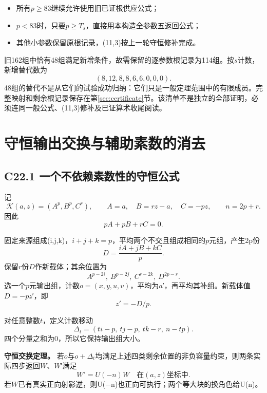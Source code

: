 \begin{itemize}
\tightlist
\item
  {所有\ensuremath{p}\ensuremath{\ge}83继续允许使用旧已证根供应公式；}
\item
  {\ensuremath{p<83}时，只要\ensuremath{p}\ensuremath{\ge}\ensuremath{T_{s}}，直接用本构造全参数五返回公式；}
\item
  {其他小参数保留原根记录，(11,3)按上一轮守恒修补完成。}
\end{itemize}

{旧162组中恰有48组满足新增条件，故需保留的逐参数根记录为114组。按\ensuremath{s}计数，新增替代数为} \[
(8,12,8,8,6,6,0,0,0).
\] {48组的替代不是从它们的试验成功归纳：它们只是一般定理范围中的有限成员。完整映射和剩余根记录保存在}第\ref{sec:certificate}节{。该清单不是独立的全部证明，必须连同一般公式、(11,3)修补及已证算术收尾阅读。}


\section{守恒输出交换与辅助素数的消去}\label{construct:conservation}
\subsection*{\texorpdfstring{{C22.1} {一个不依赖素数性的守恒公式}}{C22.1 一个不依赖素数性的守恒公式}}\label{C22-h146}

{记} \[
\mathcal K(a,z)=(A^p,B^p,C^r),\qquad
A=a,\quad B=rz-a,\quad C=-pz,\qquad n=2p+r.
\] {因此} \[
pA+pB+rC=0.
\tag{C22.1.1}
\]

{固定来源组成(i,j,k)，\ensuremath{i+j+k=p}，平均两个不交且组成相同的\ensuremath{p}元组，产生2p份} \[
D=\frac{iA+jB+kC}{p}.
\] {保留\ensuremath{r}份\ensuremath{D}作新载体；其余位置为} \[
A^{p-2i},\ B^{p-2j},\ C^{r-2k},\ D^{2p-r}.
\] {选一个\ensuremath{p}元输出组，计数\ensuremath{o=(x,y,u,v)}，平均为\ensuremath{a}′，再平均其补组。新载体值\ensuremath{D=-pz}′，即} \[
z'=-D/p.
\]

{对任意整数\ensuremath{t}，定义计数移动} \[
\boxed{
\Delta_t=(ti-p,\ tj-p,\ tk-r,\ n-tp).
}
\tag{C22.1.2}
\] {四个分量之和为0，所以它保持输出组大小。}

\textbf{{守恒交换定理。}} {若\ensuremath{o}与\ensuremath{o+\Delta _{t}}均满足上述四类剩余位置的非负容量约束，则两条实际四步返回\ensuremath{W}、\ensuremath{W}′满足} \[
\boxed{W'=U(-n)W\quad\text{在}(a,z)\text{坐标中}.}
\tag{C22.1.3}
\] {若\ensuremath{W}已有真实正向射影逆，则U(−n)也正向可执行；两个等大块的换角色给U(n)。}

